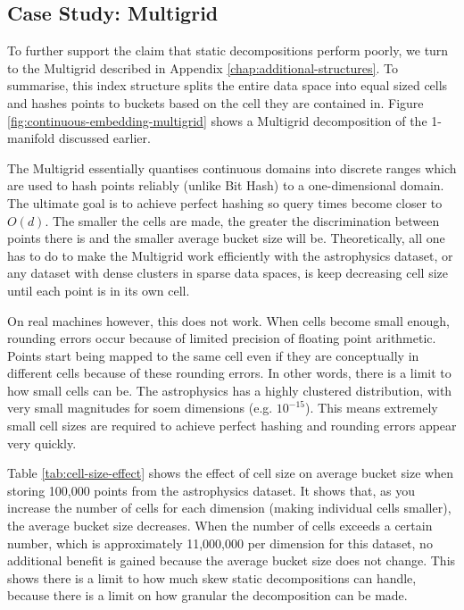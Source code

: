 \subsection{Case Study: Multigrid}

To further support the claim that static decompositions perform poorly, we turn to the Multigrid described in Appendix \ref{chap:additional-structures}. To summarise, this index structure splits the entire data space into equal sized cells and hashes points to buckets based on the cell they are contained in. Figure \ref{fig:continuous-embedding-multigrid} shows a Multigrid decomposition of the 1-manifold discussed earlier.

The Multigrid essentially quantises continuous domains into discrete ranges which are used to hash points reliably (unlike Bit Hash) to a one-dimensional domain. The ultimate goal is to achieve perfect hashing so query times become closer to $O(d)$. The smaller the cells are made, the greater the discrimination between points there is and the smaller average bucket size will be. Theoretically, all one has to do to make the Multigrid work efficiently with the astrophysics dataset, or any dataset with dense clusters in sparse data spaces, is keep decreasing cell size until each point is in its own cell.

On real machines however, this does not work. When cells become small enough, rounding errors occur because of limited precision of floating point arithmetic. Points start being mapped to the same cell even if they are conceptually in different cells because of these rounding errors. In other words, there is a limit to how small cells can be. The astrophysics has a highly clustered distribution, with very small magnitudes for soem dimensions (e.g. $10^{-15}$). This means extremely small cell sizes are required to achieve perfect hashing and rounding errors appear very quickly.

Table \ref{tab:cell-size-effect} shows the effect of cell size on average bucket size when storing 100,000 points from the astrophysics dataset. It shows that, as you increase the number of cells for each dimension (making individual cells smaller), the average bucket size decreases. When the number of cells exceeds a certain number, which is approximately 11,000,000 per dimension for this dataset, no additional benefit is gained because the average bucket size does not change.  This shows there is a limit to how much skew static decompositions can handle, because there is a limit on how granular the decomposition can be made.	
	
